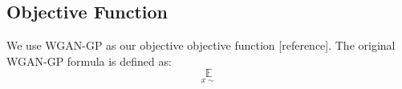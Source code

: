 \subsection{Objective Function}
We use WGAN-GP as our objective objective function [reference]. The original WGAN-GP formula is defined as:
\begin{equation}
\underset{x \sim }{\mathbb{E}}
\end{equation}